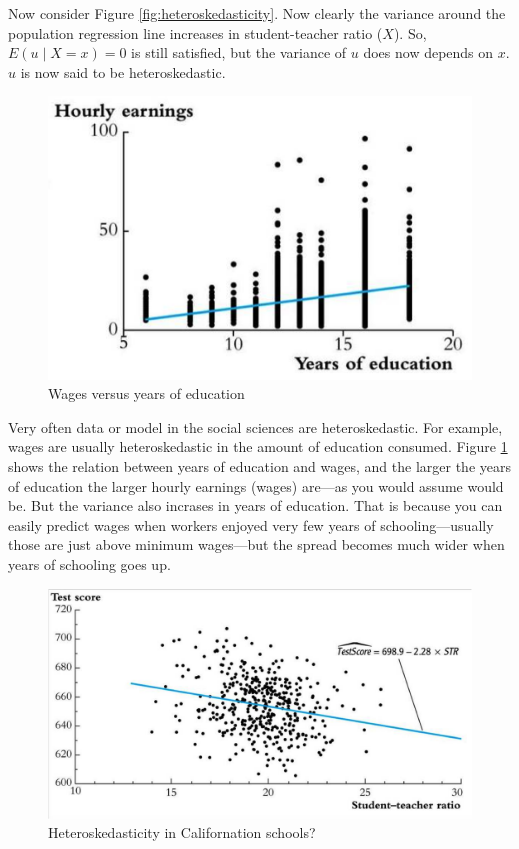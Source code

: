 \documentclass[
]{book}
\begin{document}
Now consider Figure \ref{fig:heteroskedasticity}. Now clearly the variance around the population regression line increases in student-teacher ratio (\(X\)). So, \(E(u \mid X=x) = 0\) is still satisfied, but the variance of \(u\) does now depends on \(x\). \(u\) is now said to be heteroskedastic.

\begin{figure}

{\centering \includegraphics[width=600px]{./figures/Sheet23} 

}

\caption{Wages versus years of education}\label{fig:wages}
\end{figure}

Very often data or model in the social sciences are heteroskedastic. For example, wages are usually heteroskedastic in the amount of education consumed. Figure \ref{fig:wages} shows the relation between years of education and wages, and the larger the years of education the larger hourly earnings (wages) are---as you would assume would be. But the variance also incrases in years of education. That is because you can easily predict wages when workers enjoyed very few years of schooling---usually those are just above minimum wages---but the spread becomes much wider when years of schooling goes up.

\begin{figure}

{\centering \includegraphics[width=600px]{./figures/Sheet24} 

}

\caption{Heteroskedasticity in Californation schools?}\label{fig:heteroskedasticityca}
\end{figure}
\end{document}
